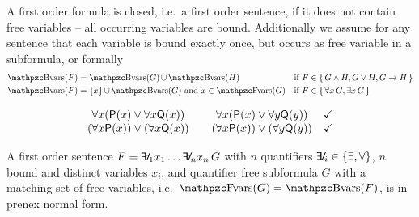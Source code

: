 \begin{definition}\label{def:fof:closed}\label{def:fof:sentence}
	A first order formula is closed, i.e.~a first order {\myem sentence},
	if it does not contain free variables -- all occurring variables are bound.
	Additionally we assume for any sentence
	that each variable is bound exactly once,
	but occurs as free variable in a subformula,
	or formally
	\begin{align*}
	\bvar(F) &= \bvar(G)\disjointunion\bvar(H)
	 &&\text{if } F \in\{\,G\land H,G\lor H,G\limp H\,\}
	\\
	\bvar(F) &= \{x\}\disjointunion\bvar(G)\text{ and } x\in\fvar(G)
	&&\text{if }F \in\{\, \forall x\,G, \exists x\,G\,\}
\end{align*}
\end{definition}

\begin{example}
	\[
	\begin{array}{clcl}
		\forall x ({{\mathsf P}(x) \lor \forall x {{\mathsf Q}(x)}}) &
		&
		\forall x ({{\mathsf P}(x) \lor \forall y {{\mathsf Q}(y)}}) &
		\checkmark
		\\
		(\forall x {{\mathsf P}(x)}) \lor (\forall x {{\mathsf Q}(x)}) &
		&
		(\forall x {{\mathsf P}(x)}) \lor (\forall y {{\mathsf Q}(y)}) &
		\checkmark
	\end{array}
	\]

\end{example}

\begin{definition}[\PNF]
	A first order sentence $F = \quantify_1 x_1 \ldots \quantify_n x_n\, G$
	with $n$ quantifiers $\quantify_i \in \{\exists,\forall\}$,
	$n$ bound and distinct variables $x_i$,
	and quantifier free subformula $G$ with
	a matching set of free variables, i.e.~$\fvar(G) = \bvar(F)$,
	is in {\myem prenex normal form}.
\end{definition}


